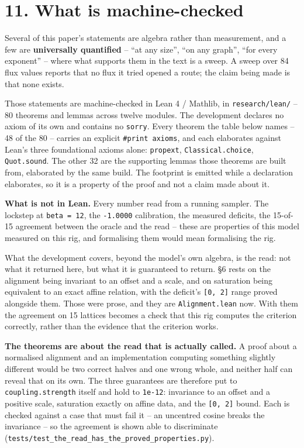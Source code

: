 \documentclass[10pt,letterpaper,twocolumn]{article}
\begin{document}
\section{11. What is machine-checked}\label{11-what-is-machine-checked}

Several of this paper's statements are algebra rather than measurement, and a few are
\textbf{universally quantified} -- ``at any size'', ``on any graph'', ``for every exponent'' -- where what
supports them in the text is a sweep. A sweep over 84 flux values reports that no flux it tried
opened a route; the claim being made is that none exists.

Those statements are machine-checked in Lean 4 / Mathlib, in \texttt{research/\allowbreak{}lean/\allowbreak{}} -- 80 theorems and
lemmas across twelve modules. The development declares no axiom of its own and contains no
\texttt{sorry}. Every theorem the table below names -- 48 of the 80 -- carries an explicit
\texttt{\#print\ axioms}, and each elaborates against Lean's three foundational axioms alone: \texttt{propext},
\texttt{Classical.\allowbreak{}choice}, \texttt{Quot.\allowbreak{}sound}. The other 32 are the supporting lemmas those theorems are built
from, elaborated by the same build. The footprint is emitted while a declaration elaborates, so it
is a property of the proof and not a claim made about it.

\textbf{What is not in Lean.} Every number read from a running sampler. The lockstep at
\texttt{beta\ =\allowbreak{}\ 12}, the \texttt{-{}\allowbreak{}1.\allowbreak{}0000} calibration, the measured deficits, the 15-of-15 agreement between the
oracle and the read -- these are properties of this model measured on this rig, and formalising them
would mean formalising the rig.

What the development covers, beyond the model's own algebra, is the read: not what it returned
here, but what it is guaranteed to return. §6 rests on the alignment being invariant to an
offset and a scale, and on saturation being equivalent to an exact affine relation, with the
deficit's \texttt{[\allowbreak{}0,\allowbreak{}\ 2]\allowbreak{}} range proved alongside them. Those were prose, and they are \texttt{Alignment.\allowbreak{}lean}
now. With
them the agreement on 15 lattices becomes a check that this rig computes the criterion correctly,
rather than the evidence that the criterion works.

\textbf{The theorems are about the read that is actually called.} A proof about a normalised alignment
and an implementation computing something slightly different would be two correct halves and one
wrong whole, and neither half can reveal that on its own. The three guarantees are therefore put to
\texttt{coupling.\allowbreak{}strength} itself and hold to \texttt{1e-{}\allowbreak{}12}: invariance to an offset and a positive scale,
saturation exactly on affine data, and the \texttt{[\allowbreak{}0,\allowbreak{}\ 2]\allowbreak{}} bound. Each is checked against a case that must
fail it -- an uncentred cosine breaks the invariance -- so the agreement is shown able to
discriminate (\texttt{tests/\allowbreak{}test\_\allowbreak{}the\_\allowbreak{}read\_\allowbreak{}has\_\allowbreak{}the\_\allowbreak{}proved\_\allowbreak{}properties.\allowbreak{}py}).
\end{document}
